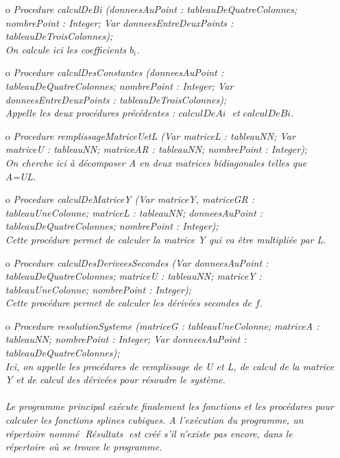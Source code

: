 \documentclass{article}
\begin{document}
\begin{enumerate}
	\item[o] \it Procedure calculDeBi (donneesAuPoint : tableauDeQuatreColonnes; nombrePoint : Integer; Var donneesEntreDeuxPoints : tableauDeTroisColonnes);\\
	\rm On calcule ici les coefficients $b_{i}$.\\
	
	\item[o] \it Procedure calculDesConstantes (donneesAuPoint : tableauDeQuatreColonnes; nombrePoint : Integer; Var donneesEntreDeuxPoints : tableauDeTroisColonnes);\\
	\rm Appelle les deux proc\'{e}dures pr\'{e}c\'{e}dentes : $calculDeAi \;$ et $calculDeBi$.\\
	
	\item[o] \it Procedure remplissageMatriceUetL (Var matriceL : tableauNN; Var matriceU : tableauNN; matriceAR : tableauNN; nombrePoint : Integer);\\
	\rm On cherche ici \`{a} d\'{e}composer A en deux matrices bidiagonales telles que A=UL.
	
	\item[o] \it Procedure calculDeMatriceY (Var matriceY, matriceGR : tableauUneColonne; matriceL : tableauNN; donneesAuPoint : tableauDeQuatreColonnes; nombrePoint : Integer);\\
	\rm Cette proc\'edure permet de calculer la matrice Y qui va \^etre multipli\'ee par L.\\
	
	\item[o] \it Procedure calculDesDeriveesSecondes (Var donneesAuPoint : tableauDeQuatreColonnes; matriceU : tableauNN; matriceY : tableauUneColonne; nombrePoint : Integer);\\
	\rm Cette proc\'{e}dure permet de calculer les d\'{e}riv\'{e}es secondes de $f$.\\
	
	\item[o] \it Procedure resolutionSysteme (matriceG :  tableauUneColonne; matriceA : tableauNN; nombrePoint : Integer; Var donneesAuPoint : tableauDeQuatreColonnes);\\
	\rm Ici, on appelle les proc\'{e}dures de remplissage de U et L, de calcul de la matrice Y et de calcul des d\'{e}riv\'{e}es pour r\'{e}soudre le syst\`eme.\\
\\
	Le programme principal ex\'{e}cute finalement les fonctions et les proc\'{e}dures pour calculer les fonctions splines cubiques. A l'ex\'{e}cution du programme, un r\'{e}pertoire nomm\'{e} \guillemotleft $\;$R\'{e}sultats \guillemotright $\;$est cr\'{e}\'{e} s'il n'existe pas encore, dans le r\'{e}pertoire o\`{u} se trouve le programme.\\

\end{enumerate}
\end{document}
